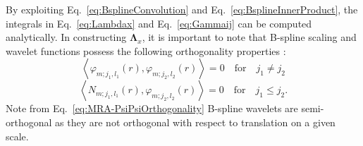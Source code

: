 \documentclass[review,authoryear,3p]{elsarticle}
\begin{document}
By exploiting Eq.~\eqref{eq:BsplineConvolution} and Eq.~\eqref{eq:BsplineInnerProduct}, the integrals in Eq.~\eqref{eq:Lambdax} and Eq.~\eqref{eq:Gammaij} can be computed analytically. In constructing $\boldsymbol\Lambda_{x}$, it is important to note that B-spline scaling and wavelet functions possess the following orthogonality properties \citep{Unser1993}: 
\begin{equation}
  \left\langle \varphi_{m;j_1,l_1}(r),\varphi_{m;j_2,l_2}(r)\right\rangle =0  \quad \mathrm{for} \quad j_1\neq j_2
 \label{eq:MRA-PsiPsiOrthogonality} 
 \end{equation}
 \begin{equation}
  \left\langle N_{m;j_1,l_1}(r),\varphi_{m;j_2,l_2}(r)\right\rangle =0  \quad \mathrm{for} \quad j_1\leq j_2.
 \label{eq:MRA-PhiPsiOrthogonality}
 \end{equation}
Note from Eq.~\eqref{eq:MRA-PsiPsiOrthogonality} B-spline wavelets are semi-orthogonal as they are not orthogonal with respect to translation on a given scale.
\end{document}
